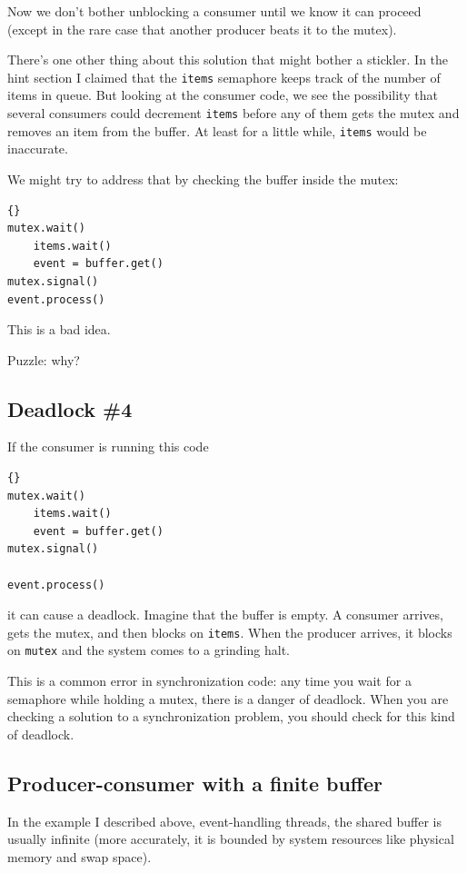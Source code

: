 \documentclass{book}
\newcommand{\clearemptydoublepage}{\newpage\cleardoublepage}
\begin{document}
Now we don't bother unblocking a consumer until we know it can proceed
(except in the rare case that another producer beats it to the mutex).

There's one other thing about this solution that might bother
a stickler.  In the hint section I claimed that the {\tt items}
semaphore keeps track of the number of items in queue.  But looking
at the consumer code, we see the possibility that several consumers
could decrement {\tt items} before any of them gets the mutex
and removes an item from the buffer.  At least for a little while,
{\tt items} would be inaccurate.

We might try to address that by checking the buffer inside the
mutex:

\begin{lstlisting}[title={Broken consumer solution}]{}
mutex.wait()
    items.wait()
    event = buffer.get()
mutex.signal()
event.process()
\end{lstlisting}

This is a bad idea.

Puzzle: why?


\clearemptydoublepage
\subsection{Deadlock \#4}

If the consumer is running this code

\begin{lstlisting}[title={Broken consumer solution}]{}
mutex.wait()
    items.wait()
    event = buffer.get()
mutex.signal()

event.process()
\end{lstlisting}
%
it can cause a deadlock.  Imagine that the buffer is empty.
A consumer arrives, gets the mutex, and then blocks on
{\tt items}.  When the producer arrives, it blocks on
{\tt mutex} and the system comes to a grinding halt.

This is a common error in synchronization code: any time
you wait for a semaphore while holding a mutex, there is
a danger of deadlock.  When you are checking a solution to
a synchronization problem, you should check for this kind
of deadlock.


\subsection{Producer-consumer with a finite buffer}

In the example I described above, event-handling threads,
the shared buffer is usually infinite (more accurately, it is
bounded by system resources like physical memory and swap
space).
\end{document}
